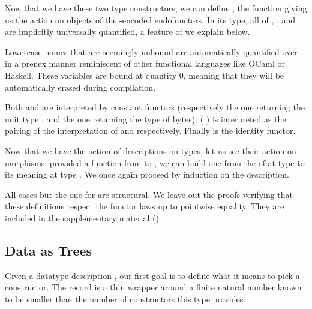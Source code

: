 Now that we have these two type constructors, we can
define , the function giving
us the action on objects of the -encoded
endofunctors.
%
In its type, all of , ,
and  are implicitly universally quantified,
a feature of \idris{} we explain below.


\begin{remark}\label{rmk:prenexpoly}
  Lowercase names that are seemingly unbound are automatically
  quantified over in a prenex manner reminiscent of other functional
  languages like OCaml or Haskell.
  These variables are bound at quantity 0, meaning that they will
  be automatically erased during compilation.
\end{remark}

Both  and  are interpreted by constant
functors (respectively the one returning the unit type ,
and the one returning the type of bytes).
%
(  )
is interpreted as the pairing of the interpretation of
 and  respectively.
%
Finally  is the identity functor.

Now that we have the action of descriptions on types,
let us see their action on morphisms: provided a
function from  to , we can
build one from the  of 
at type  to its meaning at type .
%
We once again proceed by induction on the description.

\label{def:fmap}

All cases but the one for  are structural.
%
We leave out the proofs verifying that these definitions
respect the functor laws up to pointwise equality.
They are included in the supplementary material
().

\subsection{Data as Trees}

Given a datatype description , our first goal is
to define what it means to pick a constructor.
%
The  record is a thin wrapper around a finite
natural number known to be smaller than the number of constructors
this type provides.

